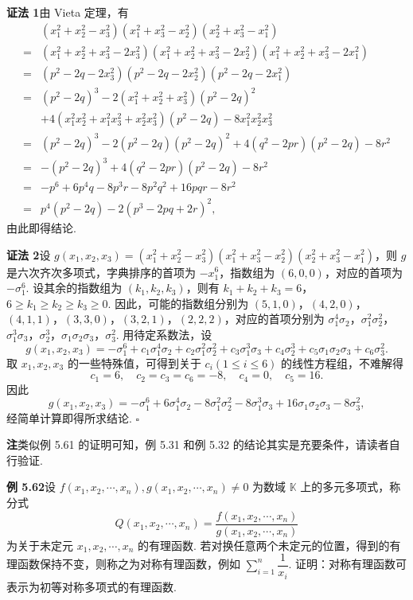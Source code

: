 \documentclass[UTF8, 12pt, fontset=fandol, oneside]{ctexart}
\begin{document}
\noindent\textbf{证法 1}\quad 由 Vieta 定理，有
\[
\begin{aligned}
&(x_1^2+x_2^2-x_3^2)(x_1^2+x_3^2-x_2^2)(x_2^2+x_3^2-x_1^2)\\
={}&(x_1^2+x_2^2+x_3^2-2x_3^2)(x_1^2+x_2^2+x_3^2-2x_2^2)(x_1^2+x_2^2+x_3^2-2x_1^2)\\
={}&(p^2-2q-2x_3^2)(p^2-2q-2x_2^2)(p^2-2q-2x_1^2)\\
={}&(p^2-2q)^3-2(x_1^2+x_2^2+x_3^2)(p^2-2q)^2\\
&+4(x_1^2x_2^2+x_1^2x_3^2+x_2^2x_3^2)(p^2-2q)-8x_1^2x_2^2x_3^2\\
={}&(p^2-2q)^3-2(p^2-2q)(p^2-2q)^2+4(q^2-2pr)(p^2-2q)-8r^2\\
={}&-(p^2-2q)^3+4(q^2-2pr)(p^2-2q)-8r^2\\
={}&-p^6+6p^4q-8p^3r-8p^2q^2+16pqr-8r^2\\
={}&p^4(p^2-2q)-2(p^3-2pq+2r)^2,
\end{aligned}
\]
由此即得结论.

\noindent\textbf{证法 2}\quad 设 $g(x_1,x_2,x_3)=(x_1^2+x_2^2-x_3^2)(x_1^2+x_3^2-x_2^2)(x_2^2+x_3^2-x_1^2)$，则 $g$ 是六次齐次多项式，字典排序的首项为 $-x_1^6$，指数组为 $(6,0,0)$，对应的首项为 $-\sigma_1^6$. 设其余的指数组为 $(k_1,k_2,k_3)$，则有 $k_1+k_2+k_3=6$，$6\ge k_1\ge k_2\ge k_3\ge0$. 因此，可能的指数组分别为 $(5,1,0)$，$(4,2,0)$，$(4,1,1)$，$(3,3,0)$，$(3,2,1)$，$(2,2,2)$，对应的首项分别为 $\sigma_1^4\sigma_2$，$\sigma_1^2\sigma_2^2$，$\sigma_1^3\sigma_3$，$\sigma_2^3$，$\sigma_1\sigma_2\sigma_3$，$\sigma_3^2$. 用待定系数法，设
\[
g(x_1,x_2,x_3)=-\sigma_1^6+c_1\sigma_1^4\sigma_2+c_2\sigma_1^2\sigma_2^2+c_3\sigma_1^3\sigma_3+c_4\sigma_2^3+c_5\sigma_1\sigma_2\sigma_3+c_6\sigma_3^2.
\]
取 $x_1,x_2,x_3$ 的一些特殊值，可得到关于 $c_i(1\le i\le6)$ 的线性方程组，不难解得
\[
c_1=6,\quad c_2=c_3=c_6=-8,\quad c_4=0,\quad c_5=16.
\]
因此
\[
g(x_1,x_2,x_3)=-\sigma_1^6+6\sigma_1^4\sigma_2-8\sigma_1^2\sigma_2^2-8\sigma_1^3\sigma_3+16\sigma_1\sigma_2\sigma_3-8\sigma_3^2,
\]
经简单计算即得所求结论. \hfill $\square$

\noindent\textbf{注}\quad 类似例 5.61 的证明可知，例 5.31 和例 5.32 的结论其实是充要条件，请读者自行验证.

\noindent\textbf{例 5.62}\quad 设 $f(x_1,x_2,\cdots,x_n),g(x_1,x_2,\cdots,x_n)\ne0$ 为数域 $\mathbb{K}$ 上的多元多项式，称分式
\[
Q(x_1,x_2,\cdots,x_n)=\frac{f(x_1,x_2,\cdots,x_n)}{g(x_1,x_2,\cdots,x_n)}
\]
为关于未定元 $x_1,x_2,\cdots,x_n$ 的有理函数. 若对换任意两个未定元的位置，得到的有理函数保持不变，则称之为对称有理函数，例如 $\sum_{i=1}^n\dfrac1{x_i}$. 证明：对称有理函数可表示为初等对称多项式的有理函数.
\end{document}
